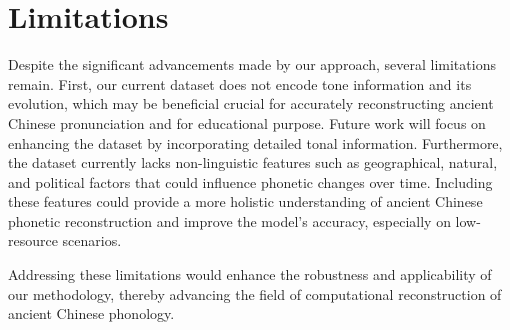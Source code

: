 \section*{Limitations}
Despite the significant advancements made by our approach, several limitations remain. 
First, our current dataset does not encode tone information and its evolution, which may be beneficial crucial for accurately reconstructing ancient Chinese pronunciation and for educational purpose. Future work will focus on enhancing the dataset by incorporating detailed tonal information. Furthermore, the dataset currently lacks non-linguistic features such as geographical, natural, and political factors that could influence phonetic changes over time. Including these features could provide a more holistic understanding of ancient Chinese phonetic reconstruction and improve the model's accuracy, especially on low-resource scenarios.

Addressing these limitations would enhance the robustness and applicability of our methodology, thereby advancing the field of computational reconstruction of ancient Chinese phonology.